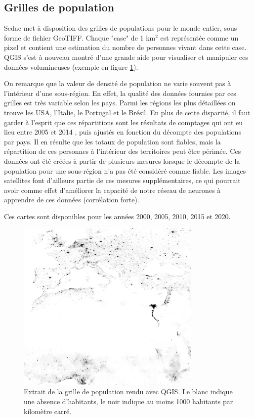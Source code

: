 \documentclass[a4paper, 11pt]{report}
\begin{document}
\subsection{Grilles de population}
Sedac \cite{sedac} met à disposition des grilles de populations pour le monde entier, sous forme de fichier GeoTIFF. Chaque "case" de 1 km$^2$ est représentée comme un pixel et contient une estimation du nombre de personnes vivant dans cette case. QGIS s'est à nouveau montré d'une grande aide pour visualiser et manipuler ces données volumineuses (exemple en figure \ref{qgis-sedac}).

On remarque que la valeur de densité de population ne varie souvent pas à l'intérieur d'une sous-région. En effet, la qualité des données fournies par ces grilles est très variable selon les pays. Parmi les régions les plus détaillées on trouve les USA, l'Italie, le Portugal et le Brésil. En plus de cette disparité, il faut garder à l'esprit que ces répartitions sont les résultats de comptages qui ont eu lieu entre 2005 et 2014 \cite{sedac}, puis ajustés en fonction du décompte des populations par pays. Il en résulte que les totaux de population sont fiables, mais la répartition de ces personnes à l'intérieur des territoires peut être périmée.
Ces données ont été créées à partir de plusieurs mesures lorsque le décompte de la population pour une sous-région n'a pas été considéré comme fiable. Les images satellites font d'ailleurs partie de ces mesures supplémentaires, ce qui pourrait avoir comme effet d'améliorer la capacité de notre réseau de neurones à apprendre de ces données (corrélation forte).

Ces cartes sont disponibles pour les années 2000, 2005, 2010, 2015 et 2020.

\begin{figure}[h]
	\centering
	\includegraphics[width=0.8\textwidth]{img/pop_subset.png}
	\caption{Extrait de la grille de population \cite{sedac} rendu avec QGIS. Le blanc indique une absence d'habitants, le noir indique au moins 1000 habitants par kilomètre carré.}
	\label{qgis-sedac}
\end{figure}
\end{document}
